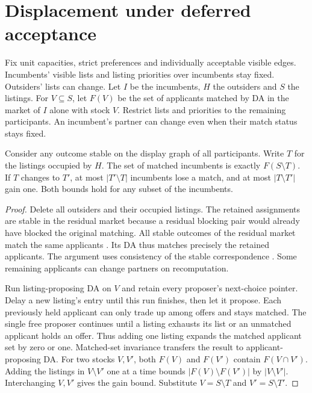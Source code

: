 \section{Displacement under deferred acceptance}\label{sec:menu}
Fix unit capacities, strict preferences and individually acceptable visible edges. Incumbents' visible lists and listing priorities over incumbents stay fixed. Outsiders' lists can change. Let $I$ be the incumbents, $H$ the outsiders and $S$ the listings. For $V\subseteq S$, let $F(V)$ be the set of applicants matched by DA in the market of $I$ alone with stock $V$. Restrict lists and priorities to the remaining participants. An incumbent's partner can change even when their match status stays fixed.

\begin{theorem}\label{thm:occupied-seats}
Consider any outcome stable on the display graph of all participants. Write $T$ for the listings occupied by $H$. The set of matched incumbents is exactly $F(S\setminus T)$. If $T$ changes to $T'$, at most $|T'\setminus T|$ incumbents lose a match, and at most $|T\setminus T'|$ gain one. Both bounds hold for any subset of the incumbents.
\end{theorem}
\begin{proof}
Delete all outsiders and their occupied listings. The retained assignments are stable in the residual market because a residual blocking pair would already have blocked the original matching. All stable outcomes of the residual market match the same applicants \citep{galesoto,roth1986}. Its DA thus matches precisely the retained applicants. The argument uses consistency of the stable correspondence \citep{sasaki}. Some remaining applicants can change partners on recomputation.

Run listing-proposing DA on $V$ and retain every proposer's next-choice pointer. Delay a new listing's entry until this run finishes, then let it propose. Each previously held applicant can only trade up among offers and stays matched. The single free proposer continues until a listing exhausts its list or an unmatched applicant holds an offer. Thus adding one listing expands the matched applicant set by zero or one. Matched-set invariance transfers the result to applicant-proposing DA. For two stocks $V,V'$, both $F(V)$ and $F(V')$ contain $F(V\cap V')$. Adding the listings in $V\setminus V'$ one at a time bounds $|F(V)\setminus F(V')|$ by $|V\setminus V'|$. Interchanging $V,V'$ gives the gain bound. Substitute $V=S\setminus T$ and $V'=S\setminus T'$.
\end{proof}

